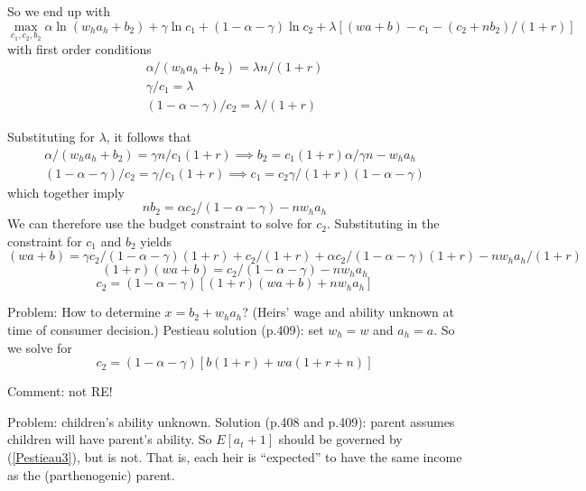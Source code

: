 \documentclass{article}
\begin{document}
So we end up with
\begin{equation}\label{u-max}
\max_{c_{1}, c_{2}, b_{2}}
\alpha \ln (w_{h}a_{h}+ b_{2})
+ \gamma \ln c_{1}
+ (1-\alpha-\gamma) \ln c_{2}
+ \lambda [ (w a + b) - c_{1} - (c_{2} + n b_{2})/(1+r)]
\end{equation}
with first order conditions
\begin{gather}
\alpha/(w_{h}a_{h}+b_{2}) = \lambda n/(1+r)
\label{dL/db2}
\\
\gamma/c_{1} = \lambda
\label{dL/dc1}
\\
(1-\alpha-\gamma)/ c_{2} = \lambda / (1+r)
\label{dL/dc2}
\end{gather}



Substituting for $\lambda$, it follows that
\begin{gather}
\alpha/(w_{h}a_{h}+b_{2}) = \gamma n/ c_{1} (1+r)
\implies
b_{2} = c_{1} (1+r)\alpha/ \gamma n - w_{h}a_{h}
\\
(1-\alpha-\gamma)/ c_{2} = \gamma / c_{1} (1+r)  \implies  c_{1} = c_{2}\gamma/(1+r) (1-\alpha-\gamma)
\end{gather}
which together imply
\begin{equation}
n b_{2} = \alpha c_{2} /(1-\alpha-\gamma)  - n w_{h} a_{h}
\end{equation}
We can therefore use the budget constraint to solve for $c_{2}$.
Substituting in the constraint for $c_{1}$ and $b_{2}$ yields
\begin{equation}
(w  a + b) = \gamma c_{2}/(1-\alpha-\gamma)(1+r) + c_{2}/(1+r) + \alpha c_{2}/(1-\alpha-\gamma)(1+r) - nw_{h}a_{h}/(1+r)
\end{equation}
\begin{equation}
(1+r)(w  a + b) = c_{2}/(1-\alpha-\gamma)  - nw_{h}a_{h}
\end{equation}
\begin{equation}
c_{2} = (1-\alpha-\gamma)[(1+r)(w  a + b)   + nw_{h}a_{h}]
\end{equation}

Problem: How to determine $x=b_{2}+w_{h}a_{h}$?
(Heirs' wage and ability unknown at time of consumer decision.)
Pestieau solution (p.409): set $w_{h}=w$ and $a_{h}=a$.
So we solve for
\begin{equation}
c_{2} = (1-\alpha-\gamma)[b(1+r) + wa(1+r+n)]
\end{equation}

Comment: not RE!

Problem: children's ability unknown.
Solution (p.408 and p.409): parent assumes children will have parent's ability.
So $E[a_t+1]$ should be governed by (\ref{Pestieau3}), but is not.
That is, each heir is ``expected'' to have the same income as the (parthenogenic) parent.
\end{document}
